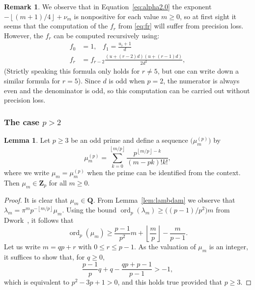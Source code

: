 \documentclass[a4paper,11pt]{article}
\numberwithin{equation}{section}
\providecommand{\floor}[1]{\left\lfloor#1\right\rfloor}   %
\newcommand{\ZZ}{\mathbf{Z}} %
\newcommand{\QQ}{\mathbf{Q}} %
\DeclareMathOperator{\ord}{ord}          %
\theoremstyle{definition}
\newtheorem{lem}[thm]{Lemma}
\newtheorem{rem}[thm]{Remark}
\begin{document}
\begin{rem}
We observe that in Equation~\eqref{eq:alpha2.0} the exponent 
$-\floor{(m+1)/4}+\nu_m$ is nonpositive for each value $m \geq 0$, 
so at first sight it seems that the computation of the $f_r$ from
\eqref{eq:fr} will suffer from precision loss. However, the $f_r$
can be computed recursively using:
\begin{align*}
f_0 &=1, \; \; \; f_1=\frac{u_i+1}{d} \\
f_r & = f_{r-2} \frac{(u + (r - 2)d)(u + (r - 1)d)}{2d^2} ,
\end{align*}
(Strictly speaking this formula only holds for $r \neq 5$, but one can write down a similar formula for $r=5$).
Since $d$ is odd when $p=2$, the numerator is always even and the denominator is odd,
so this computation can be carried out without precision loss.
\end{rem}

\subsubsection{The case $p > 2$}

\begin{lem} \label{lem:mup}
Let $p \geq 3$ be an odd prime and define a sequence 
$\bigl(\mu_m^{(p)}\bigr)$ by 
\begin{equation}
\mu_m^{(p)} = \sum_{k=0}^{\floor{m/p}} \frac{p^{\floor{m/p} - k}}{(m-pk)! k!}, 
\end{equation}
where we write $\mu_m = \mu_m^{(p)}$ when the prime can be identified 
from the context.  Then $\mu_m \in \ZZ_p$ for all $m \geq 0$.
\end{lem}

\begin{proof}
It is clear that $\mu_m \in \QQ$.  From Lemma~\ref{lem:lambdam} 
we observe that $\lambda_m = \pi^m p^{- \floor{m/p}} \mu_m$.  Using the 
bound $\ord_p(\lambda_m) \geq \bigl((p-1)/p^2\bigr) m$ 
from Dwork~\citep[pp.~55--57]{Dwork1962}, it follows that 
\begin{equation}
\ord_p (\mu_m) \geq \frac{p-1}{p^2} m + \floor{\frac{m}{p}} - \frac{m}{p-1}.
\end{equation}
Let us write $m = q p + r$ with $0 \leq r \leq p-1$.  As the valuation 
of $\mu_m$ is an integer, it suffices to show that, for $q \geq 0$, 
\begin{equation}
\frac{p-1}{p} q + q - \frac{q p + p - 1}{p - 1} > -1,
\end{equation}
which is equivalent to $p^2 - 3p + 1 > 0$, and this holds true 
provided that $p \geq 3$.
\end{proof}
\end{document}
